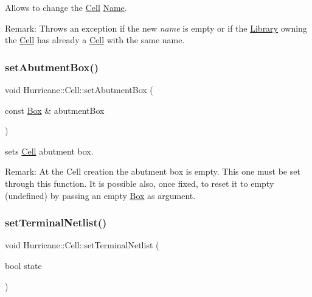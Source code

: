 Allows to change the \mbox{\hyperlink{classHurricane_1_1Cell}{Cell}} \mbox{\hyperlink{classHurricane_1_1Name}{Name}}.

\begin{DoxyParagraph}{Remark\+: Throws an exception if the new {\itshape name} is empty or if the}
\mbox{\hyperlink{classHurricane_1_1Library}{Library}} owning the \mbox{\hyperlink{classHurricane_1_1Cell}{Cell}} has already a \mbox{\hyperlink{classHurricane_1_1Cell}{Cell}} with the same name. 
\end{DoxyParagraph}
\mbox{\label{classHurricane_1_1Cell_ab1949e2b708f0bd2d215ab90cfe864e0}} 
\subsubsection{\texorpdfstring{set\+Abutment\+Box()}{setAbutmentBox()}}
{\footnotesize\ttfamily void Hurricane\+::\+Cell\+::set\+Abutment\+Box (\begin{DoxyParamCaption}\item[{const \mbox{\hyperlink{classHurricane_1_1Box}{Box}} \&}]{abutment\+Box }\end{DoxyParamCaption})}

sets \mbox{\hyperlink{classHurricane_1_1Cell}{Cell}} abutment box.

\begin{DoxyParagraph}{Remark\+: At the Cell creation the abutment box is empty. This one must}
be set through this function. It is possible also, once fixed, to reset it to empty (undefined) by passing an empty \mbox{\hyperlink{classHurricane_1_1Box}{Box}} as argument. 
\end{DoxyParagraph}
\mbox{\label{classHurricane_1_1Cell_a15958b25e911e8f5543557b6deea5618}} 
\subsubsection{\texorpdfstring{set\+Terminal\+Netlist()}{setTerminalNetlist()}}
{\footnotesize\ttfamily void Hurricane\+::\+Cell\+::set\+Terminal\+Netlist (\begin{DoxyParamCaption}\item[{bool}]{state }\end{DoxyParamCaption})\hspace{0.3cm}{\ttfamily [inline]}}

